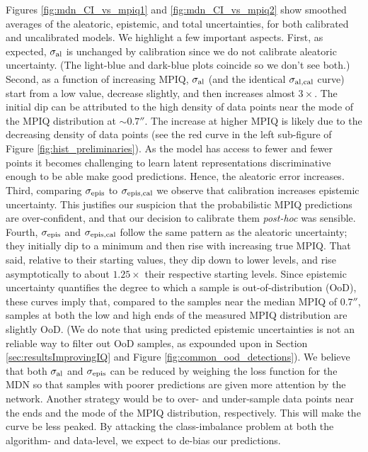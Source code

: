 Figures \ref{fig:mdn_CI_vs_mpiq1} and \ref{fig:mdn_CI_vs_mpiq2} show smoothed averages of the aleatoric, epistemic, and total uncertainties, for both calibrated and uncalibrated models. We highlight a few important aspects. First, as expected, $\sigma_{\rm al}$ is unchanged by calibration since we do not calibrate aleatoric uncertainty. (The light-blue and dark-blue plots coincide so we don't see both.)  Second, as a function of increasing MPIQ, $\sigma_{\rm al}$ (and the identical $\sigma_{\rm al, cal}$ curve) start from a low value, decrease slightly, and then increases almost $3\times$. The initial dip can be attributed to the high density of data points near the mode of the MPIQ distribution at $\sim0.7''$. The  increase at higher MPIQ is likely due to the decreasing density of data points (see the red curve in the left sub-figure of Figure \ref{fig:hist_preliminaries}).  As the model has access to fewer and fewer points it becomes challenging to learn latent representations discriminative enough to be able make good predictions.  Hence, the aleatoric error increases. Third, comparing $\sigma_{\rm epis}$ to $\sigma_{\rm epis, cal}$ we observe that calibration increases epistemic uncertainty.  This justifies our suspicion that the probabilistic MPIQ predictions are over-confident, and that our decision to calibrate them {\it post-hoc} was sensible. Fourth, $\sigma_{\rm epis}$ and $\sigma_{\rm epis, cal}$ follow the same pattern as the aleatoric uncertainty;  they initially dip to a minimum and then rise  with increasing true MPIQ. That said, relative to their starting values, they dip down to lower levels, and rise asymptotically to about $1.25\times$ their respective starting levels. 
Since epistemic uncertainty quantifies the degree to which a sample is out-of-distribution (OoD), these curves imply that, compared to the samples near the median MPIQ of $0.7''$, samples at both the low and high ends of the measured MPIQ distribution are slightly OoD. (We do note that using predicted epistemic uncertainties is not an reliable way to filter out OoD samples, as expounded upon in Section \ref{sec:resultsImprovingIQ} and Figure \ref{fig:common_ood_detections}). We believe that both $\sigma_{\rm al}$ and $\sigma_{\rm epis}$ can be reduced by weighing the loss function for the MDN so that samples with poorer predictions are given more attention by the network. Another strategy would be to over- and under-sample data points near the ends and the mode of the MPIQ distribution, respectively.  This will make the curve be less peaked. By attacking the class-imbalance problem at both the algorithm- and data-level, we expect to de-bias our predictions.

